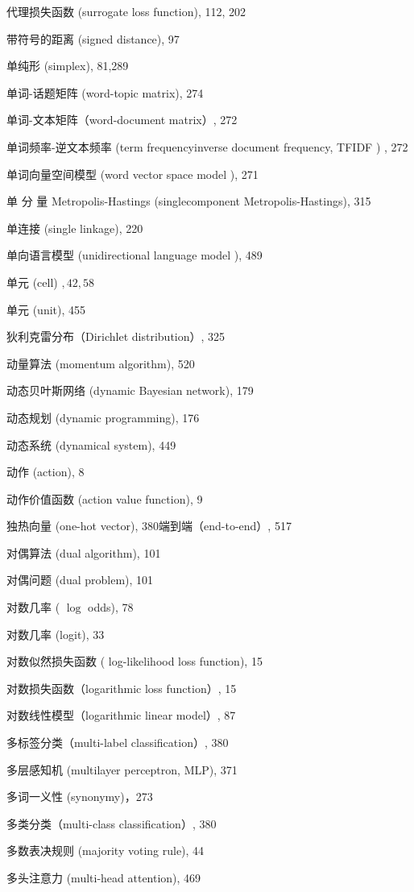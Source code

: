 \documentclass[10pt]{article}
\begin{document}
代理损失函数 (surrogate loss function), 112, 202

带符号的距离 (signed distance), 97

单纯形 (simplex), 81,289

单词-话题矩阵 (word-topic matrix), 274

单词-文本矩阵（word-document matrix）, 272

单词频率-逆文本频率 (term frequencyinverse document frequency, TFIDF ) , 272

单词向量空间模型 (word vector space model ), 271

单 分 量 Metropolis-Hastings (singlecomponent Metropolis-Hastings), 315

单连接 (single linkage), 220

单向语言模型 (unidirectional language model ), 489

单元 (cell) $, 42,58$

单元 (unit), 455

狄利克雷分布（Dirichlet distribution）, 325

动量算法 (momentum algorithm), 520

动态贝叶斯网络 (dynamic Bayesian network), 179

动态规划 (dynamic programming), 176

动态系统 (dynamical system), 449

动作 (action), 8

动作价值函数 (action value function), 9

独热向量 (one-hot vector), 380端到端（end-to-end）, 517

对偶算法 (dual algorithm), 101

对偶问题 (dual problem), 101

对数几率 ( $\log$ odds), 78

对数几率 (logit), 33

对数似然损失函数 ( log-likelihood loss function), 15

对数损失函数（logarithmic loss function）, 15

对数线性模型（logarithmic linear model）, 87

多标签分类（multi-label classification）, 380

多层感知机 (multilayer perceptron, MLP), 371

多词一义性 (synonymy)，273

多类分类（multi-class classification）, 380

多数表决规则 (majority voting rule), 44

多头注意力 (multi-head attention), 469
\end{document}
